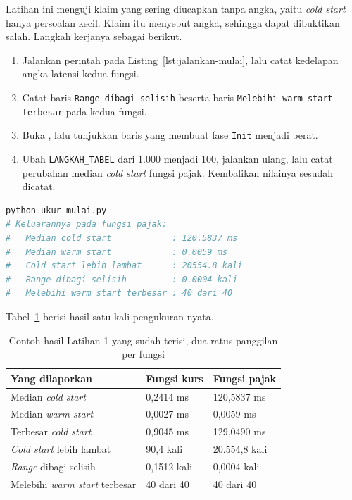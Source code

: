 Latihan ini menguji klaim yang sering diucapkan tanpa angka, yaitu \textit{cold
start} hanya persoalan kecil. Klaim itu menyebut angka, sehingga dapat dibuktikan
salah. Langkah kerjanya sebagai berikut.

\begin{enumerate}
  \item Jalankan perintah pada Listing~\ref{lst:jalankan-mulai}, lalu catat
    kedelapan angka latensi kedua fungsi.
  \item Catat baris \texttt{Range dibagi selisih} beserta baris
    \texttt{Melebihi warm start terbesar} pada kedua fungsi.
  \item Buka , lalu tunjukkan
    baris yang membuat fase \texttt{Init} menjadi berat.
  \item Ubah \texttt{LANGKAH\_TABEL} dari 1.000 menjadi 100, jalankan ulang,
    lalu catat perubahan median \textit{cold start} fungsi pajak. Kembalikan
    nilainya sesudah dicatat.
\end{enumerate}

\begin{lstlisting}[language=bash, caption={Mengukur \textit{cold start cost},
  skrip tersedia di \berkas{sources/chapter14/ukur_mulai.py}},
  label=lst:jalankan-mulai]
python ukur_mulai.py
# Keluarannya pada fungsi pajak:
#   Median cold start            : 120.5837 ms
#   Median warm start            : 0.0059 ms
#   Cold start lebih lambat      : 20554.8 kali
#   Range dibagi selisih         : 0.0004 kali
#   Melebihi warm start terbesar : 40 dari 40
\end{lstlisting}

Tabel~\ref{tab:lat1serverless-contoh} berisi hasil satu kali pengukuran nyata.

\begin{table}[htbp]
  \centering
  \caption{Contoh hasil Latihan 1 yang sudah terisi, dua ratus panggilan per
    fungsi}
  \label{tab:lat1serverless-contoh}
  \begin{tabularx}{\textwidth}{|X|l|l|}
    \hline
    \textbf{Yang dilaporkan} & \textbf{Fungsi kurs} & \textbf{Fungsi pajak} \\
    \hline
    Median \textit{cold start} & 0,2414 ms & 120,5837 ms \\
    \hline
    Median \textit{warm start} & 0,0027 ms & 0,0059 ms \\
    \hline
    Terbesar \textit{cold start} & 0,9045 ms & 129,0490 ms \\
    \hline
    \textit{Cold start} lebih lambat & 90,4 kali & 20.554,8 kali \\
    \hline
    \textit{Range} dibagi selisih & 0,1512 kali & 0,0004 kali \\
    \hline
    Melebihi \textit{warm start} terbesar & 40 dari 40 & 40 dari 40 \\
    \hline
  \end{tabularx}
\end{table}

